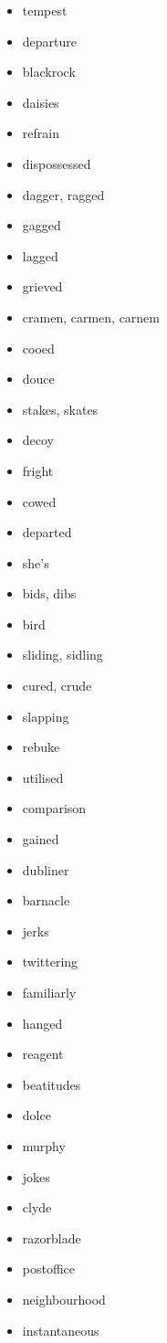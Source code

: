 \documentclass{article}
\begin{document}
\begin{itemize}
    \item tempest
    \item departure
    \item blackrock
    \item daisies
    \item refrain
    \item dispossessed
    \item dagger, ragged
    \item gagged
    \item lagged
    \item grieved
    \item cramen, carmen, carnem
    \item cooed
    \item douce
    \item stakes, skates
    \item decoy
    \item fright
    \item cowed
    \item departed
    \item she's
    \item bids, dibs
    \item bird
    \item sliding, sidling
    \item cured, crude
    \item slapping
    \item rebuke
    \item utilised
    \item comparison
    \item gained
    \item dubliner
    \item barnacle
    \item jerks
    \item twittering
    \item familiarly
    \item hanged
    \item reagent
    \item beatitudes
    \item dolce
    \item murphy
    \item jokes
    \item clyde
    \item razorblade
    \item postoffice
    \item neighbourhood
    \item instantaneous

\end{itemize}
\end{document}
